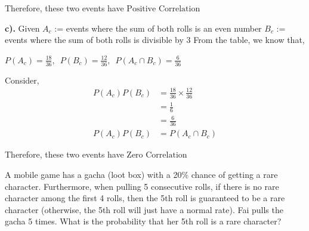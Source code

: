 \documentclass[a4paper, 10pt]{article}
\begin{document}
\begin{tosubmit}
	Therefore, these two events have \( \boxed{\text{Positive Correlation}} \)

	\myspace

	\par\noindent\textbf{c).} Given \newline
	\( A_c \) := events where the sum of both rolls is an even number \newline
	\( B_c \) := events where the sum of both rolls is divisible by 3 \newline
	From the table, we know that,
	\begin{center}
		\( P(A_c) = \frac{18}{36},\enspace P(B_c) = \frac{12}{36},\enspace P(A_c \cap B_c) = \frac{6}{36} \)
	\end{center}

	Consider,
	\begin{align*}
		P(A_c)P(B_c) & = \frac{18}{36}\times\frac{12}{36} \\
		             & = \frac{1}{6}                      \\
		             & = \frac{6}{36}                     \\
		P(A_c)P(B_c) & = P(A_c \cap B_c)
	\end{align*}

	Therefore, these two events have \( \boxed{\text{Zero Correlation}} \)
\end{tosubmit}

\begin{problem}
A mobile game has a gacha (loot box) with a 20\% chance of getting a rare character.
Furthermore, when pulling 5 consecutive rolls, if there is no rare character among the first 4 rolls,
then the 5th roll is guaranteed to be a rare character (otherwise, the 5th roll will just have a normal rate).
Fai pulls the gacha 5 times. What is the probability that her 5th roll is a rare character?
\end{problem}
\end{document}
